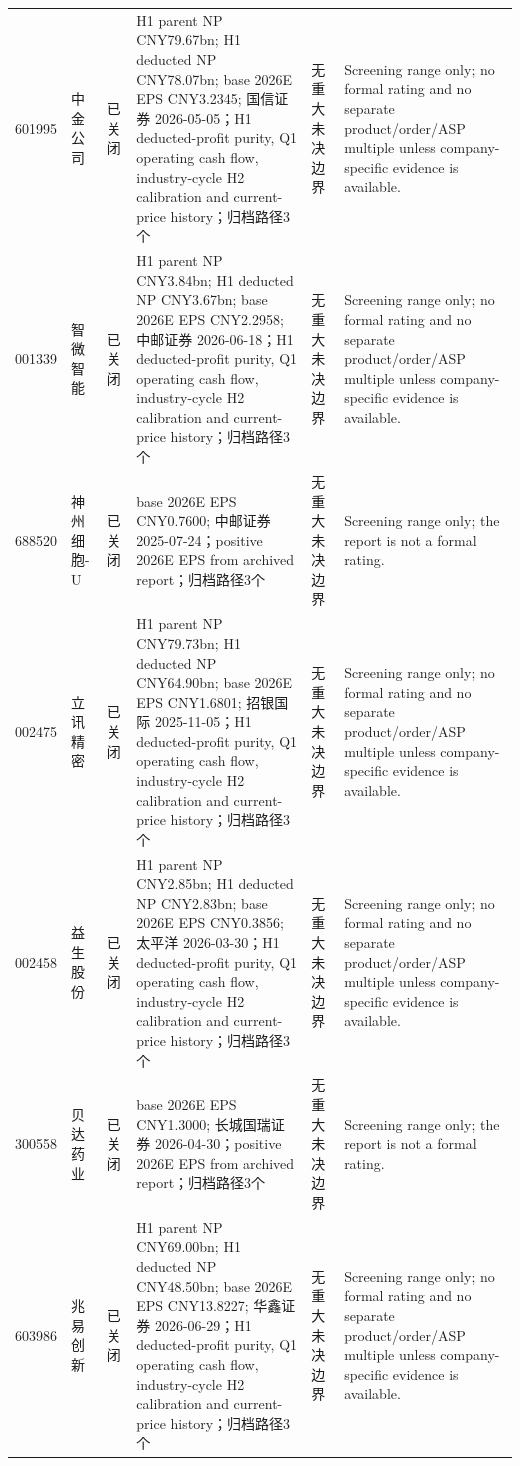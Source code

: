 \begin{longtable}{L{1.00cm}L{1.40cm}L{1.45cm}L{2.85cm}L{2.50cm}L{3.05cm}}
601995 & 中金公司 & 已关闭 & H1 parent NP CNY79.67bn; H1 deducted NP CNY78.07bn; base 2026E EPS CNY3.2345; 国信证券 2026-05-05；H1 deducted-profit purity, Q1 operating cash flow, industry-cycle H2 calibration and current-price history；归档路径3个 & 无重大未决边界 & Screening range only; no formal rating and no separate product/order/ASP multiple unless company-specific evidence is available. \\
001339 & 智微智能 & 已关闭 & H1 parent NP CNY3.84bn; H1 deducted NP CNY3.67bn; base 2026E EPS CNY2.2958; 中邮证券 2026-06-18；H1 deducted-profit purity, Q1 operating cash flow, industry-cycle H2 calibration and current-price history；归档路径3个 & 无重大未决边界 & Screening range only; no formal rating and no separate product/order/ASP multiple unless company-specific evidence is available. \\
688520 & 神州细胞-U & 已关闭 & base 2026E EPS CNY0.7600; 中邮证券 2025-07-24；positive 2026E EPS from archived report；归档路径3个 & 无重大未决边界 & Screening range only; the report is not a formal rating. \\
002475 & 立讯精密 & 已关闭 & H1 parent NP CNY79.73bn; H1 deducted NP CNY64.90bn; base 2026E EPS CNY1.6801; 招银国际 2025-11-05；H1 deducted-profit purity, Q1 operating cash flow, industry-cycle H2 calibration and current-price history；归档路径3个 & 无重大未决边界 & Screening range only; no formal rating and no separate product/order/ASP multiple unless company-specific evidence is available. \\
002458 & 益生股份 & 已关闭 & H1 parent NP CNY2.85bn; H1 deducted NP CNY2.83bn; base 2026E EPS CNY0.3856; 太平洋 2026-03-30；H1 deducted-profit purity, Q1 operating cash flow, industry-cycle H2 calibration and current-price history；归档路径3个 & 无重大未决边界 & Screening range only; no formal rating and no separate product/order/ASP multiple unless company-specific evidence is available. \\
300558 & 贝达药业 & 已关闭 & base 2026E EPS CNY1.3000; 长城国瑞证券 2026-04-30；positive 2026E EPS from archived report；归档路径3个 & 无重大未决边界 & Screening range only; the report is not a formal rating. \\
603986 & 兆易创新 & 已关闭 & H1 parent NP CNY69.00bn; H1 deducted NP CNY48.50bn; base 2026E EPS CNY13.8227; 华鑫证券 2026-06-29；H1 deducted-profit purity, Q1 operating cash flow, industry-cycle H2 calibration and current-price history；归档路径3个 & 无重大未决边界 & Screening range only; no formal rating and no separate product/order/ASP multiple unless company-specific evidence is available. \\

\end{longtable}
